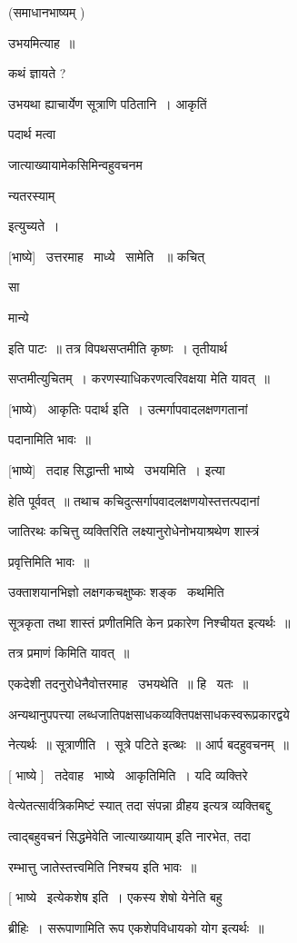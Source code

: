 \documentclass[11pt, openany]{book}
\begin{document}
(समाधानभाष्यम् ) 

उभयमित्याह~॥ 

कथं ज्ञायते ? 

उभयथा ह्याचार्येण सूत्राणि पठितानि~। आकृतिं 

पदार्थ मत्वा \textendash\ {\qt जात्याख्यायामेकसिमिन्वहुवचनम \textendash\ 

न्यतरस्याम्} इत्युच्यते~। 



[भाष्ये] \textendash\ उत्तरमाह \textendash\ माध्ये \textendash\ सामेति ~॥ कचित् {\qt सा 

मान्ये} इति पाटः~॥ तत्र विपथसप्तमीति कृष्णः~। तृतीयार्थ 

सप्तमीत्युचितम्~। करणस्याधिकरणत्वरिवक्षया मेति यावत्~॥ 

[भाष्ये) \textendash\ आकृतिः पदार्थ इति~। उत्मर्गापवादलक्षणगतानां 

पदानामिति भावः~॥ 

[भाष्ये] \textendash\ तदाह सिद्धान्ती भाष्ये \textendash\ उभयमिति~। इत्या \textendash\ 

हेति पूर्ववत्~॥ तथाच कचिदुत्सर्गापवादलक्षणयोस्तत्तत्पदानां 

जातिरथः कचित्तु व्यक्तिरिति लक्ष्यानुरोधेनोभयाश्रथेण शास्त्रं 

प्रवृत्तिमिति भावः~॥ 

उक्ताशयानभिज्ञो लक्षगकचक्षुष्कः शङ्क \textendash\ कथमिति 

सूत्रकृता तथा शास्तं प्रणीतमिति केन प्रकारेण निश्चीयत इत्यर्थः~॥ 

तत्र प्रमाणं किमिति यावत्~॥ 

एकदेशी तदनुरोधेनैवोत्तरमाह \textendash\ उभयथेति~॥ हि \textendash\ यतः~॥ 

अन्यथानुपपत्त्या लब्धजातिपक्षसाधकव्यक्तिपक्षसाधकस्वरूप्रकारद्वये \textendash\ 

नेत्यर्थः~॥ सूत्राणीति~। सूत्रे पटिते इत्व्थः~॥ आर्प बदहुवचनम्~॥ 

[ भाष्ये ] \textendash\ तदेवाह \textendash\ भाष्ये \textendash\ आकृतिमिति~। यदि व्यक्तिरे \textendash\ 

वेत्येतत्सार्वत्रिकमिष्टं स्यात् तदा संपन्ना व्रीहय इत्यत्र
व्यक्तिबद्दु \textendash\ 

त्वाद्बहुवचनं सिद्धमेवेति {\qt जात्याख्यायाम्} इति नारभेत, तदा \textendash\ 

रम्भात्तु जातेस्तत्त्वमिति निश्चय इति भावः~॥ 

[ भाष्ये \textendash\ इत्येकशेष इति~। एकस्य शेषो येनेति बहु \textendash\ 

ब्रीहिः~। सरूपाणामिति रूप एकशेपविधायको योग इत्यर्थः~॥ 
\end{document}
